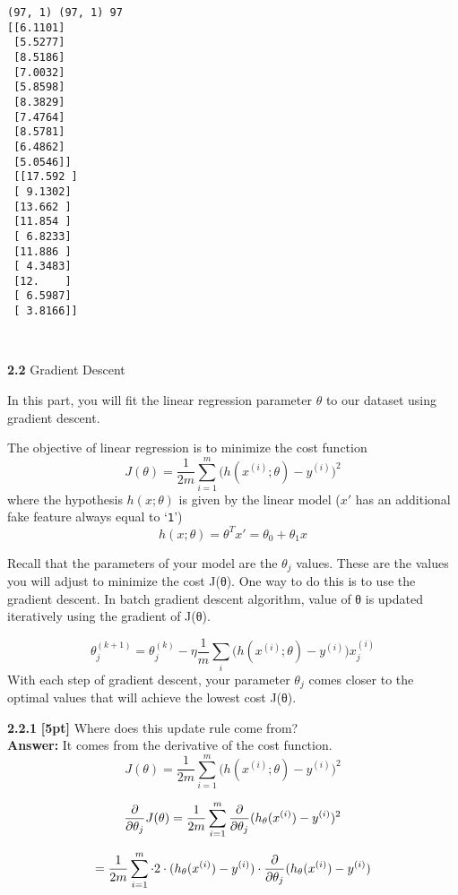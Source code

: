 \documentclass[11pt]{article}
\begin{document}
    \begin{Verbatim}[commandchars=\\\{\}]
(97, 1) (97, 1) 97
[[6.1101]
 [5.5277]
 [8.5186]
 [7.0032]
 [5.8598]
 [8.3829]
 [7.4764]
 [8.5781]
 [6.4862]
 [5.0546]]
 [[17.592 ]
 [ 9.1302]
 [13.662 ]
 [11.854 ]
 [ 6.8233]
 [11.886 ]
 [ 4.3483]
 [12.    ]
 [ 6.5987]
 [ 3.8166]]
\end{Verbatim}

    \begin{center}
    \end{center}
    { \hspace*{\fill} \\}
    
    \textbf{2.2} Gradient Descent

In this part, you will fit the linear regression parameter \(\theta\) to
our dataset using gradient descent.

The objective of linear regression is to minimize the cost function
\[ J(\theta) = \frac{1}{2m} \sum_{i = 1}^{m} \big(h(x^{(i)}; \theta) - y^{(i)}\big)^2\]
where the hypothesis \(h(x;\theta)\) is given by the linear model
(\(x'\) has an additional fake feature always equal to `\texttt{1}')
\[ h(x;\theta) = \theta^T x' = \theta_0 + \theta_1 x\]

Recall that the parameters of your model are the \(\theta_j\) values.
These are the values you will adjust to minimize the cost J(θ). One way
to do this is to use the gradient descent. In batch gradient descent
algorithm, value of θ is updated iteratively using the gradient of J(θ).

\[ \theta_j^{(k+1)} = \theta_j^{(k)} - \eta \frac{1}{m} \sum_i \big(h(x^{(i)}; \theta) - y^{(i)}\big) x^{(i)}_j \]
With each step of gradient descent, your parameter \(\theta_j\) comes
closer to the optimal values that will achieve the lowest cost J(θ).

\textbf{2.2.1} \textbf{{[}5pt{]}} Where does this update rule come
from?\\
\textbf{Answer:} It comes from the derivative of the cost function.
\[ J(\theta) = \frac{1}{2m} \sum_{i = 1}^{m} \big(h(x^{(i)}; \theta) - y^{(i)}\big)^2\]

\[
\frac{\partial }{\partial \theta_j}J(\theta)
= \frac{1}{2m}\sum_{i=1}^{m}\frac{\partial }{\partial \theta_j}(h_{\theta}(x^{(i)}) - y^{(i)})^{2} \\
\]

\[
= \frac{1}{2m}\sum_{i=1}^{m} \cdot 2 \cdot (h_{\theta}(x^{(i)}) - y^{(i)}) \cdot \frac{\partial }{\partial \theta_j}(h_{\theta}(x^{(i)}) - y^{(i)}) \\
\]
\end{document}
